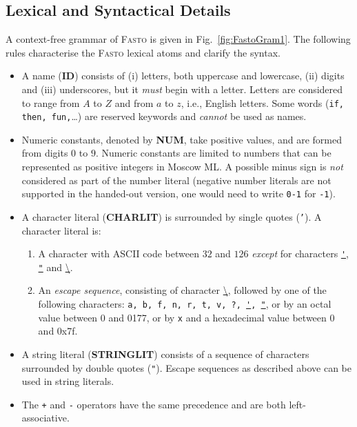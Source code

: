 \documentclass[a4paper,11pt]{article}
\newcommand{\fasto}{\textsc{Fasto}\xspace}
\begin{document}
\subsection{Lexical and Syntactical Details}
\label{subsec:lexicalrules}
A context-free grammar of \fasto is given in Fig.~\ref{fig:FastoGram1}.
The following rules characterise the \fasto lexical atoms and clarify the syntax.

\begin{itemize}
\item A name ({\bf ID}) consists of (i) letters, both uppercase and lowercase,
   (ii) digits and (iii) underscores, but it {\em must} begin with a letter. 
   Letters are considered to range from $A$ to $Z$ and from $a$ to $z$, i.e., 
   English letters. 
   Some words ({\tt if, then, fun,}\ldots) are reserved keywords and {\em cannot} 
   be used as names.
  
\item Numeric constants, denoted by {\bf NUM}, take positive values, and 
   are formed from digits $0$ to $9$. Numeric constants are limited to 
   numbers that can be represented as positive integers in Moscow ML.
%
  A possible minus sign is \emph{not} considered as part of the number literal
  (negative number literals are not supported in the handed-out version, one would 
  need to write {\tt 0-1} for {\tt -1}).

\item A character literal ({\bf CHARLIT}) is surrounded by single quotes 
   (\texttt {'}). A character literal is:
  \begin{enumerate}
  \item A character with ASCII code between $32$ and $126$ \emph{except}
     for characters \texttt{\underline'}, \texttt {\underline"} and \underline{\textbackslash}.
  \item An \emph{escape sequence}, consisting of character 
  \underline\textbackslash, 
  followed by one of the following characters: 
  \texttt{a, b, f, n, r, t, v, ?, \underline', \underline"}, or
  by an octal value between 0 and 0177, 	or by \texttt{x} and a 
  hexadecimal value between 0 and 0x7f.
  \end{enumerate}

\item A string literal ({\bf STRINGLIT}) consists of a sequence of
   characters surrounded by double quotes (\texttt {"}).
	Escape sequences as described above can be used in string literals.
  
\item The {\tt +} and {\tt -} operators have the same precedence and
   are both left-associative.


\end{itemize}
\end{document}
